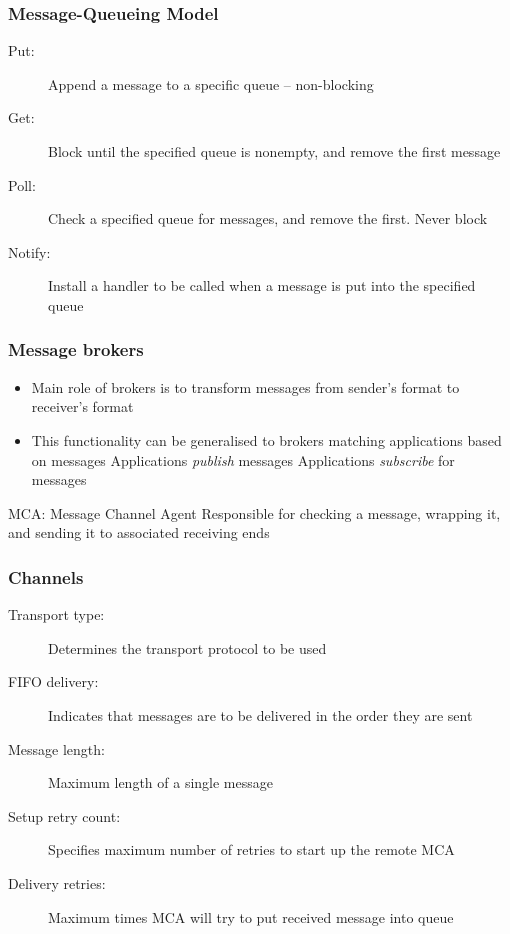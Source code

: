 \subsubsection{Message-Queueing Model}
\begin{description}
	\item[Put:] Append a message to a specific queue -- non-blocking
	\item[Get:] Block until the specified queue is nonempty, and remove the first message
	\item[Poll:] Check a specified queue for messages, and remove the first. Never block
	\item[Notify:] Install a handler to be called when a message is put into the specified queue
\end{description}

\subsubsection{Message brokers}
\begin{itemize}
	\item Main role of brokers is to transform messages from sender's format to receiver's format
	\item This functionality can be generalised to brokers matching applications based on messages
	\subitem Applications \textit{publish} messages
	\subitem Applications \textit{subscribe} for messages	
\end{itemize}

\begin{note}{MCA: Message Channel Agent}
	Responsible for checking a message, wrapping it, and sending it to associated receiving ends	
\end{note}

\subsubsection{Channels}
\begin{description}
	\item[Transport type:] Determines the transport protocol to be used
	\item[FIFO delivery:] Indicates that messages are to be delivered in the order they are sent
	\item[Message length:] Maximum length of a single message
	\item[Setup retry count:] Specifies maximum number of retries to start up the remote MCA
	\item[Delivery retries:] Maximum times MCA will try to put received message into queue
\end{description}

